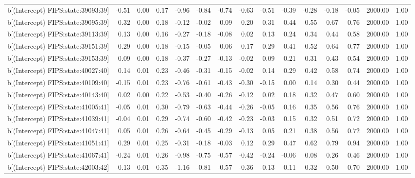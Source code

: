\begin{table}[ht]
\begin{tabular}{rrrrrrrrrrrrrrr}
  b[(Intercept) FIPS:state:39093:39] & -0.51 & 0.00 & 0.17 & -0.96 & -0.84 & -0.74 & -0.63 & -0.51 & -0.39 & -0.28 & -0.18 & -0.05 & 2000.00 & 1.00 \\ 
  b[(Intercept) FIPS:state:39095:39] & 0.32 & 0.00 & 0.18 & -0.12 & -0.02 & 0.09 & 0.20 & 0.31 & 0.44 & 0.55 & 0.67 & 0.76 & 2000.00 & 1.00 \\ 
  b[(Intercept) FIPS:state:39113:39] & 0.13 & 0.00 & 0.16 & -0.27 & -0.18 & -0.08 & 0.02 & 0.13 & 0.24 & 0.34 & 0.44 & 0.58 & 2000.00 & 1.00 \\ 
  b[(Intercept) FIPS:state:39151:39] & 0.29 & 0.00 & 0.18 & -0.15 & -0.05 & 0.06 & 0.17 & 0.29 & 0.41 & 0.52 & 0.64 & 0.77 & 2000.00 & 1.00 \\ 
  b[(Intercept) FIPS:state:39153:39] & 0.09 & 0.00 & 0.18 & -0.37 & -0.27 & -0.13 & -0.02 & 0.09 & 0.21 & 0.31 & 0.43 & 0.54 & 2000.00 & 1.00 \\ 
  b[(Intercept) FIPS:state:40027:40] & 0.14 & 0.01 & 0.23 & -0.46 & -0.31 & -0.15 & -0.02 & 0.14 & 0.29 & 0.42 & 0.58 & 0.74 & 2000.00 & 1.00 \\ 
  b[(Intercept) FIPS:state:40109:40] & -0.15 & 0.01 & 0.23 & -0.76 & -0.61 & -0.43 & -0.30 & -0.15 & 0.00 & 0.14 & 0.30 & 0.44 & 2000.00 & 1.00 \\ 
  b[(Intercept) FIPS:state:40143:40] & 0.02 & 0.00 & 0.22 & -0.53 & -0.40 & -0.26 & -0.12 & 0.02 & 0.18 & 0.32 & 0.47 & 0.60 & 2000.00 & 1.00 \\ 
  b[(Intercept) FIPS:state:41005:41] & -0.05 & 0.01 & 0.30 & -0.79 & -0.63 & -0.44 & -0.26 & -0.05 & 0.16 & 0.35 & 0.56 & 0.76 & 2000.00 & 1.00 \\ 
  b[(Intercept) FIPS:state:41039:41] & -0.04 & 0.01 & 0.29 & -0.74 & -0.60 & -0.42 & -0.23 & -0.03 & 0.15 & 0.32 & 0.51 & 0.72 & 2000.00 & 1.00 \\ 
  b[(Intercept) FIPS:state:41047:41] & 0.05 & 0.01 & 0.26 & -0.64 & -0.45 & -0.29 & -0.13 & 0.05 & 0.21 & 0.38 & 0.56 & 0.72 & 2000.00 & 1.00 \\ 
  b[(Intercept) FIPS:state:41051:41] & 0.29 & 0.01 & 0.25 & -0.31 & -0.18 & -0.03 & 0.12 & 0.29 & 0.47 & 0.62 & 0.79 & 0.94 & 2000.00 & 1.00 \\ 
  b[(Intercept) FIPS:state:41067:41] & -0.24 & 0.01 & 0.26 & -0.98 & -0.75 & -0.57 & -0.42 & -0.24 & -0.06 & 0.08 & 0.26 & 0.46 & 2000.00 & 1.00 \\ 
  b[(Intercept) FIPS:state:42003:42] & -0.13 & 0.01 & 0.35 & -1.16 & -0.81 & -0.57 & -0.36 & -0.13 & 0.11 & 0.32 & 0.50 & 0.70 & 2000.00 & 1.00 \\ 

\end{tabular}
\end{table}
